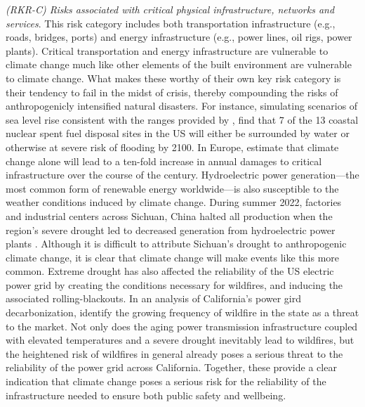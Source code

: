 \textit{(RKR-C) Risks associated with critical physical infrastructure, networks and services}. This risk category includes both transportation infrastructure (e.g., roads, bridges, ports) and energy infrastructure (e.g., power lines, oil rigs, power plants). Critical transportation and energy infrastructure are vulnerable to climate change much like other elements of the built environment are vulnerable to climate change. What makes these worthy of their own key risk category is their tendency to fail in the midst of crisis, thereby compounding the risks of anthropogenicly intensified natural disasters. 
For instance, simulating scenarios of sea level rise consistent with the ranges provided by \cite{sweet2022global}, \cite{jenkins2020unmanaged} find that 7 of the 13 coastal nuclear spent fuel disposal sites in the US will either be surrounded by water or otherwise at severe risk of flooding by 2100. In Europe, \cite{forzieri2018escalating} estimate that climate change alone will lead to a ten-fold increase in annual damages to critical infrastructure over the course of the century. Hydroelectric power generation---the most common form of renewable energy worldwide---is also susceptible to the weather conditions induced by climate change. During summer 2022, factories and industrial centers across Sichuan, China halted all production when the region's severe drought led to decreased generation from hydroelectric power plants \citep{davidson2022china}. Although it is difficult to attribute Sichuan's drought to anthropogenic climate change, it is clear that climate change will make events like this more common. Extreme drought has also affected the reliability of the US electric power grid by creating the conditions necessary for wildfires, and inducing the associated rolling-blackouts. In an analysis of California's power gird decarbonization, \cite{borenstein2021designing} identify the growing frequency of wildfire in the state as a threat to the market. Not only does the aging power transmission infrastructure coupled with elevated temperatures and a severe drought inevitably lead to wildfires, but the heightened risk of wildfires in general already poses a serious threat to the reliability of the power grid across California. Together, these provide a clear indication that climate change poses a serious risk for the reliability of the infrastructure needed to ensure both public safety and wellbeing.

